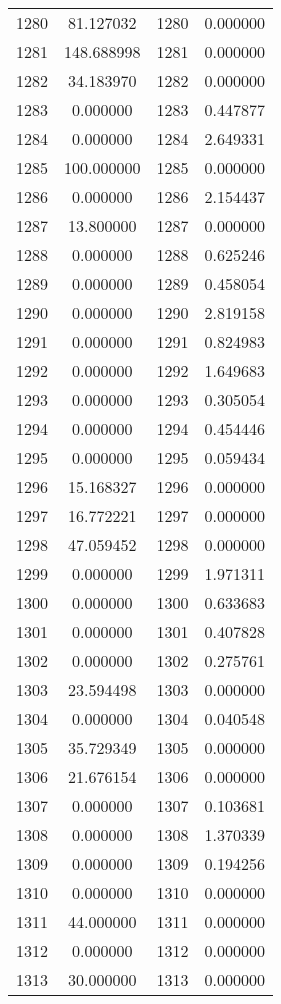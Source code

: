 \documentclass[12pt]{article}
\begin{document}
\begin{longtable}{@{}cccc@{}}
1280 & 81.127032 & 1280 & 0.000000 \\
1281 & 148.688998 & 1281 & 0.000000 \\
1282 & 34.183970 & 1282 & 0.000000 \\
1283 & 0.000000 & 1283 & 0.447877 \\
1284 & 0.000000 & 1284 & 2.649331 \\
1285 & 100.000000 & 1285 & 0.000000 \\
1286 & 0.000000 & 1286 & 2.154437 \\
1287 & 13.800000 & 1287 & 0.000000 \\
1288 & 0.000000 & 1288 & 0.625246 \\
1289 & 0.000000 & 1289 & 0.458054 \\
1290 & 0.000000 & 1290 & 2.819158 \\
1291 & 0.000000 & 1291 & 0.824983 \\
1292 & 0.000000 & 1292 & 1.649683 \\
1293 & 0.000000 & 1293 & 0.305054 \\
1294 & 0.000000 & 1294 & 0.454446 \\
1295 & 0.000000 & 1295 & 0.059434 \\
1296 & 15.168327 & 1296 & 0.000000 \\
1297 & 16.772221 & 1297 & 0.000000 \\
1298 & 47.059452 & 1298 & 0.000000 \\
1299 & 0.000000 & 1299 & 1.971311 \\
1300 & 0.000000 & 1300 & 0.633683 \\
1301 & 0.000000 & 1301 & 0.407828 \\
1302 & 0.000000 & 1302 & 0.275761 \\
1303 & 23.594498 & 1303 & 0.000000 \\
1304 & 0.000000 & 1304 & 0.040548 \\
1305 & 35.729349 & 1305 & 0.000000 \\
1306 & 21.676154 & 1306 & 0.000000 \\
1307 & 0.000000 & 1307 & 0.103681 \\
1308 & 0.000000 & 1308 & 1.370339 \\
1309 & 0.000000 & 1309 & 0.194256 \\
1310 & 0.000000 & 1310 & 0.000000 \\
1311 & 44.000000 & 1311 & 0.000000 \\
1312 & 0.000000 & 1312 & 0.000000 \\
1313 & 30.000000 & 1313 & 0.000000 \\

\end{longtable}
\end{document}
